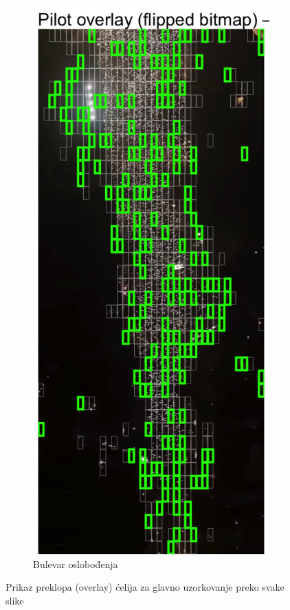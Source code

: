 \documentclass[a4paper,12pt]{article}
\begin{document}
\begin{figure}[H]
\begin{subfigure}[b]{0.3\textwidth}
	  \label{fig:kralja-milana}
	\end{subfigure}
	\hfill
	\begin{subfigure}[b]{0.3\textwidth}
	  \centering
	  \includegraphics[width=\textwidth]{../outputs/sampling_outputs/main_overlays_image/main_overlay_bulevar-oslobodjenja.png}
	  \caption{Bulevar oslobođenja}
	  \label{fig:bulevar-oslobodjenja}
	\end{subfigure}
  
	\caption{Prikaz preklopa (overlay) ćelija za glavno uzorkovanje preko svake slike}
\end{figure}
\end{document}
